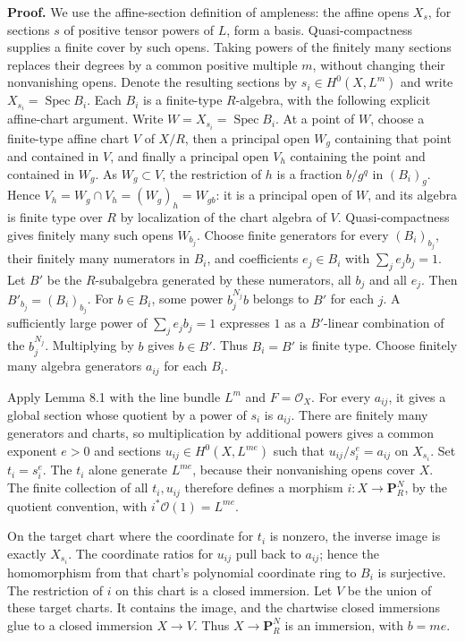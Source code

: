 \documentclass[11pt,a4paper,openany]{report}
\begin{document}
\textbf{Proof.} We use the affine-section definition of ampleness: the affine opens \(X_s\), for sections \(s\) of positive tensor powers of \(L\), form a basis. Quasi-compactness supplies a finite cover by such opens. Taking powers of the finitely many sections replaces their degrees by a common positive multiple \(m\), without changing their nonvanishing opens. Denote the resulting sections by \(s_i\in H^0(X,L^m)\) and write \(X_{s_i}=\operatorname{Spec}B_i\). Each \(B_i\) is a finite-type \(R\)-algebra, with the following explicit affine-chart argument. Write \(W=X_{s_i}=\operatorname{Spec}B_i\). At a point of \(W\), choose a finite-type affine chart \(V\) of \(X/R\), then a principal open \(W_g\) containing that point and contained in \(V\), and finally a principal open \(V_h\) containing the point and contained in \(W_g\). As \(W_g\subset V\), the restriction of \(h\) is a fraction \(b/g^q\) in \((B_i)_g\). Hence \(V_h=W_g\cap V_h=(W_g)_h=W_{gb}\): it is a principal open of \(W\), and its algebra is finite type over \(R\) by localization of the chart algebra of \(V\). Quasi-compactness gives finitely many such opens \(W_{b_j}\). Choose finite generators for every \((B_i)_{b_j}\), their finitely many numerators in \(B_i\), and coefficients \(e_j\in B_i\) with \(\sum_j e_jb_j=1\). Let \(B'\) be the \(R\)-subalgebra generated by these numerators, all \(b_j\) and all \(e_j\). Then \(B'_{b_j}=(B_i)_{b_j}\). For \(b\in B_i\), some power \(b_j^{N_j}b\) belongs to \(B'\) for each \(j\). A sufficiently large power of \(\sum_j e_jb_j=1\) expresses \(1\) as a \(B'\)-linear combination of the \(b_j^{N_j}\). Multiplying by \(b\) gives \(b\in B'\). Thus \(B_i=B'\) is finite type. Choose finitely many algebra generators \(a_{ij}\) for each \(B_i\).

Apply Lemma 8.1 with the line bundle \(L^m\) and \(F=\mathcal O_X\). For every \(a_{ij}\), it gives a global section whose quotient by a power of \(s_i\) is \(a_{ij}\). There are finitely many generators and charts, so multiplication by additional powers gives a common exponent \(e>0\) and sections \(u_{ij}\in H^0(X,L^{me})\) such that \(u_{ij}/s_i^e=a_{ij}\) on \(X_{s_i}\). Set \(t_i=s_i^e\). The \(t_i\) alone generate \(L^{me}\), because their nonvanishing opens cover \(X\). The finite collection of all \(t_i,u_{ij}\) therefore defines a morphism \(i:X\to\mathbf P_R^N\), by the quotient convention, with \(i^*\mathcal O(1)=L^{me}\).

On the target chart where the coordinate for \(t_i\) is nonzero, the inverse image is exactly \(X_{s_i}\). The coordinate ratios for \(u_{ij}\) pull back to \(a_{ij}\); hence the homomorphism from that chart's polynomial coordinate ring to \(B_i\) is surjective. The restriction of \(i\) on this chart is a closed immersion. Let \(V\) be the union of these target charts. It contains the image, and the chartwise closed immersions glue to a closed immersion \(X\to V\). Thus \(X\to\mathbf P_R^N\) is an immersion, with \(b=me\).
\end{document}
